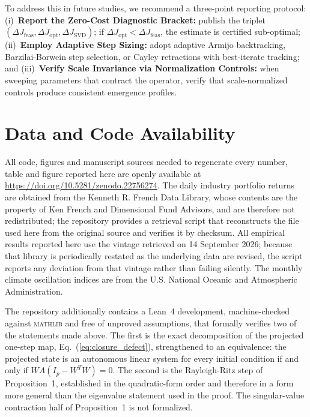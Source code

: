 \documentclass[preprint,12pt]{elsarticle}
\begin{document}
To address this in future studies, we recommend a three-point reporting protocol: (i)~\textbf{Report the Zero-Cost Diagnostic Bracket:} publish the triplet $(\Delta J_{\mathrm{feas}}, \Delta J_{\mathrm{opt}}, \Delta J_{\mathrm{SVD}})$; if $\Delta J_{\mathrm{opt}} < \Delta J_{\mathrm{feas}}$, the estimate is certified sub-optimal; (ii)~\textbf{Employ Adaptive Step Sizing:} adopt adaptive Armijo backtracking, Barzilai-Borwein step selection, or Cayley retractions with best-iterate tracking; and (iii)~\textbf{Verify Scale Invariance via Normalization Controls:} when sweeping parameters that contract the operator, verify that scale-normalized controls produce consistent emergence profiles.

\section*{Data and Code Availability}

All code, figures and manuscript sources needed to regenerate every number, table and figure reported here are openly available at \url{https://doi.org/10.5281/zenodo.22756274}. The daily industry portfolio returns are obtained from the Kenneth R. French Data Library, whose contents are the property of Ken French and Dimensional Fund Advisors, and are therefore not redistributed; the repository provides a retrieval script that reconstructs the file used here from the original source and verifies it by checksum. All empirical results reported here use the vintage retrieved on 14 September 2026; because that library is periodically restated as the underlying data are revised, the script reports any deviation from that vintage rather than failing silently. The monthly climate oscillation indices are from the U.S. National Oceanic and Atmospheric Administration.

The repository additionally contains a Lean~4 development, machine-checked against \textsc{mathlib} and free of unproved assumptions, that formally verifies two of the statements made above. The first is the exact decomposition of the projected one-step map, Eq.~(\ref{eq:closure_defect}), strengthened to an equivalence: the projected state is an autonomous linear system for every initial condition if and only if $W A (I_p - W^T W) = 0$. The second is the Rayleigh-Ritz step of Proposition~1, established in the quadratic-form order and therefore in a form more general than the eigenvalue statement used in the proof. The singular-value contraction half of Proposition~1 is not formalized.
\end{document}
